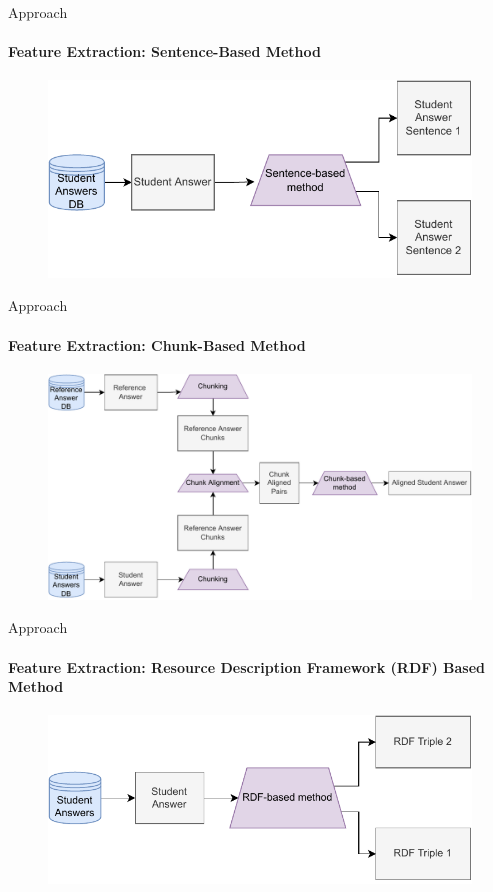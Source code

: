 \documentclass[aspectratio=169]{beamer}
\begin{document}
\begin{frame}{Approach}
\framesubtitle{Feature Extraction: Sentence-Based Method}
\begin{figure}
	\centering
	\includegraphics[scale = 1]{images/sentence_FE_slides.pdf}
	\label{fig:sentence fe slides}
\end{figure}
\end{frame}
\begin{frame}{Approach}
\framesubtitle{Feature Extraction: Chunk-Based Method}
\begin{figure}
	\centering
	\includegraphics[scale = 0.6]{images/chunk_FE_slides.pdf}
	\label{fig:chunk fe}
\end{figure}
\end{frame}
\begin{frame}{Approach}
\framesubtitle{Feature Extraction: Resource Description Framework (RDF) Based Method}
\begin{figure}
	\centering
	\includegraphics[scale = 1]{images/RDF_FE_slides.pdf}
	\label{fig:rdf fe}
\end{figure}
\end{frame}
\end{document}
